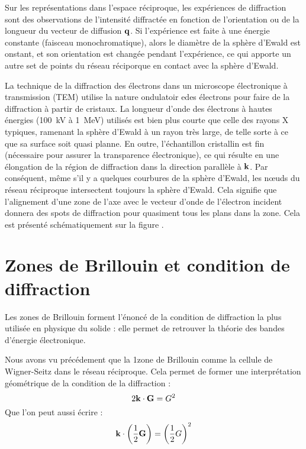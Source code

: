 Sur les représentations dans l'espace réciproque, les expériences de diffraction
sont des observations de l'intensité diffractée en fonction de l'orientation
ou de la longueur du vecteur de diffusion $\mathbf{q}$. Si l'expérience est faite
à une énergie constante (faisceau monochromatique), alors le diamètre de la
sphère d'Ewald est onstant, et son orientation est changée pendant l'expérience,
ce qui apporte un autre set de points du réseau réciporque en contact avec la
sphère d'Ewald.

La technique de la diffraction des électrons dans un microscope électronique à
transmission (TEM) utilise la nature ondulatoir edes électrons pour faire de la
diffraction à partir de cristaux. La longueur d'onde des électrons à hautes
énergies (\SI{100}{\kilo\volt} à \SI{1}{\mega\electronvolt}) utilisés est bien
plus courte que celle des rayons X typiques, ramenant la sphère d'Ewald à un
rayon très large, de telle sorte à ce que sa surface soit quasi planne.
En outre, l'échantillon cristallin est fin (nécessaire pour assurer la
transparence électronique), ce qui résulte en une élongation de la région de
diffraction dans la direction parallèle à $\mathbf{k}$.
Par conséquent, même s'il y a quelques courbures de la sphère d'Ewald, les nœuds
du réseau réciproque intersectent toujours la sphère d'Ewald. Cela signifie que
l'alignement d'une zone de l'axe avec le vecteur d'onde de l'électron
incident donnera des spots de diffraction pour quasiment tous les plans dans la
zone. Cela est présenté schématiquement sur la figure \TODO.



\section{Zones de Brillouin et condition de diffraction}

Les zones de Brillouin forment l'énoncé de la condition de diffraction la plus
utilisée en physique du solide : elle permet de retrouver la théorie des bandes
d'énergie électronique.

Nous avons vu précédement que la 1\iere zone de Brillouin comme la cellule de
Wigner-Seitz dans le réseau réciproque. Cela permet de former une interprétation
géométrique de la condition de la diffraction :
\begin{equation}
    2\mathbf{k} \cdot \mathbf{G} = G^2
\end{equation}
Que l'on peut aussi écrire :
\begin{equation}
    \mathbf{k} \cdot \left( \frac{1}{2} \mathbf{G} \right) = \left( \frac{1}{2} G \right)^2
\end{equation}

